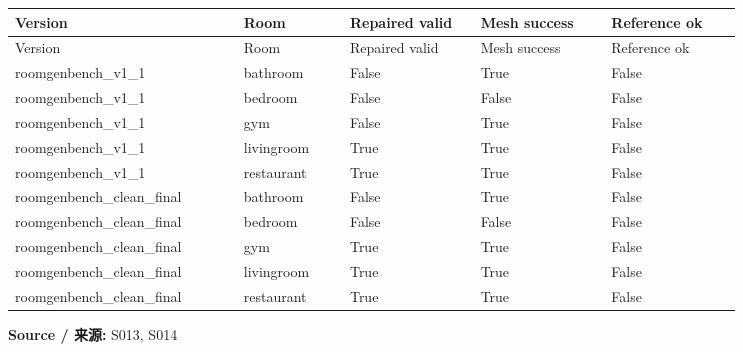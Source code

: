 \documentclass[10pt,a4paper,fontset=fandol]{ctexart}
\newcommand{\src}[1]{\par{\footnotesize\textbf{Source / 来源:} #1}\par}
\begin{document}
\endgroup
\begingroup\small
\begin{longtable}{@{}>{\raggedright\arraybackslash}p{0.2800\linewidth}>{\raggedright\arraybackslash}p{0.1300\linewidth}>{\raggedright\arraybackslash}p{0.1600\linewidth}>{\raggedright\arraybackslash}p{0.1600\linewidth}>{\raggedright\arraybackslash}p{0.1600\linewidth}@{}}
\toprule
Version & Room & Repaired valid & Mesh success & Reference ok \\
\midrule\endfirsthead
\toprule
Version & Room & Repaired valid & Mesh success & Reference ok \\
\midrule\endhead
\bottomrule\endfoot
roomgenbench\_\allowbreak{}v1\_\allowbreak{}1 & bathroom & False & True & False \\
roomgenbench\_\allowbreak{}v1\_\allowbreak{}1 & bedroom & False & False & False \\
roomgenbench\_\allowbreak{}v1\_\allowbreak{}1 & gym & False & True & False \\
roomgenbench\_\allowbreak{}v1\_\allowbreak{}1 & livingroom & True & True & False \\
roomgenbench\_\allowbreak{}v1\_\allowbreak{}1 & restaurant & True & True & False \\
roomgenbench\_\allowbreak{}clean\_\allowbreak{}final & bathroom & False & True & False \\
roomgenbench\_\allowbreak{}clean\_\allowbreak{}final & bedroom & False & False & False \\
roomgenbench\_\allowbreak{}clean\_\allowbreak{}final & gym & True & True & False \\
roomgenbench\_\allowbreak{}clean\_\allowbreak{}final & livingroom & True & True & False \\
roomgenbench\_\allowbreak{}clean\_\allowbreak{}final & restaurant & True & True & False \\
\end{longtable}
\endgroup
\src{S013, S014}
\end{document}
